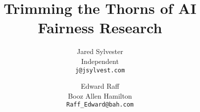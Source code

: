 \documentclass[11pt]{article}
\begin{document}
 
\title{Trimming the Thorns of AI Fairness Research}
\author{
  Jared Sylvester\\
  Independent\\
  \texttt{j@jsylvest.com}
  \and
  Edward Raff\\
  Booz Allen Hamilton\\
  \texttt{Raff\_Edward@bah.com}
}











\end{document}
